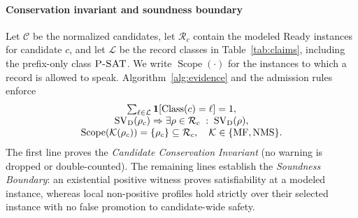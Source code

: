 \paragraph{Conservation invariant and soundness boundary}
Let $\mathcal C$ be the normalized candidates, let $\mathcal R_c$ contain the
modeled Ready instances for candidate $c$, and let $\mathcal L$ be the record
classes in Table~\ref{tab:claims}, including the prefix-only class $\textsc{P-SAT}$. We write
$\operatorname{Scope}(\cdot)$ for the instances to which a record is allowed
to speak. Algorithm~\ref{alg:evidence} and the admission rules enforce
\begin{equation}
\begin{gathered}
\textstyle\sum_{\ell\in\mathcal L}\mathbf{1}
 [\operatorname{Class}(c)=\ell]=1,\\[-1mm]
\operatorname{SV}_{\rm D}(\rho_c)\Rightarrow
 \exists\rho\in\mathcal R_c\;:\;
 \operatorname{SV}_{\rm D}(\rho),\\[-1mm]
\operatorname{Scope}\!\left(\mathcal K(\rho_c)\right)
 =\{\rho_c\}\subseteq\mathcal R_c,
 \quad\mathcal K\in\{\operatorname{MF},\operatorname{NMS}\}.
\end{gathered}
\label{eq:contract-invariants}
\end{equation}
The first line proves the \emph{Candidate Conservation Invariant} (no warning is dropped or double-counted). The remaining lines establish the \emph{Soundness Boundary}: an existential positive witness proves satisfiability at a modeled instance, whereas local non-positive profiles hold strictly over their selected instance with no false promotion to candidate-wide safety.

